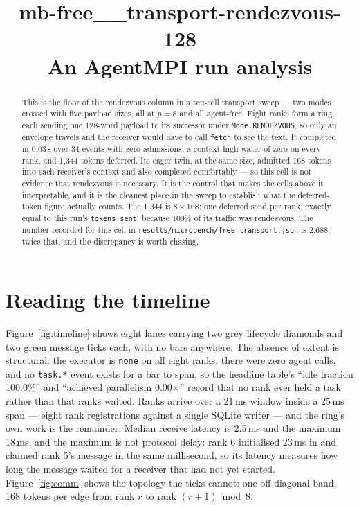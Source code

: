 \documentclass[11pt]{article}
\title{\textbf{mb-free\_\_transport-rendezvous-128}\\[2pt]\large An AgentMPI run analysis}
\author{}
\date{}
\begin{document}
\maketitle

\begin{abstract}
This is the floor of the rendezvous column in a ten-cell transport sweep --- two
modes crossed with five payload sizes, all at $p = 8$ and all agent-free. Eight ranks
form a ring, each sending one 128-word payload to its successor under
\texttt{Mode.RENDEZVOUS}, so only an envelope travels and the receiver would have to
call \texttt{fetch} to see the text. It completed in 0.03\,s over 34 events with zero
admissions, a context high water of zero on every rank, and 1{,}344 tokens deferred.
Its eager twin, at the same size, admitted 168 tokens into each receiver's context
and also completed comfortably --- so this cell is not evidence that rendezvous is
necessary. It is the control that makes the cells above it interpretable, and it is
the cleanest place in the sweep to establish what the deferred-token figure actually
counts. The 1{,}344 is $8 \times 168$: one deferred send per rank, exactly equal to
this run's \texttt{tokens sent}, because 100\% of its traffic was rendezvous. The
number recorded for this cell in \texttt{results/microbench/free-transport.json} is
2{,}688, twice that, and the discrepancy is worth chasing.
\end{abstract}



\section{Reading the timeline}

Figure~\ref{fig:timeline} shows eight lanes carrying two grey lifecycle diamonds and
two green message ticks each, with no bars anywhere. The absence of extent is
structural: the executor is \texttt{none} on all eight ranks, there were zero agent
calls, and no \texttt{task.*} event exists for a bar to span, so the headline table's
``idle fraction 100.0\%'' and ``achieved parallelism 0.00$\times$'' record that no
rank ever held a task rather than that ranks waited. Ranks arrive over a 21\,ms
window inside a 25\,ms span --- eight rank registrations against a single SQLite
writer --- and the ring's own work is the remainder. Median receive latency is
2.5\,ms and the maximum 18\,ms, and the maximum is not protocol delay: rank 6
initialised 23\,ms in and claimed rank 5's message in the same millisecond, so its
latency measures how long the message waited for a receiver that had not yet started.
Figure~\ref{fig:comm} shows the
topology the ticks cannot: one off-diagonal band, 168 tokens per edge from rank $r$
to rank $(r{+}1) \bmod 8$.
\end{document}
